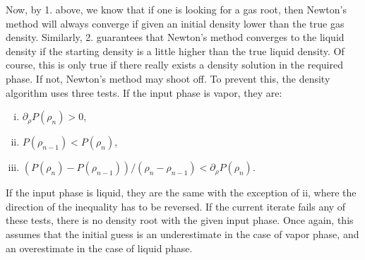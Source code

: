 \documentclass[internal,english]{sintefmemo2012}
\newcommand{\lp}{\left(}
\newcommand{\rp}{\right)}
\numberwithin{equation}{section}
\begin{document}
Now, by 1. above, we know that if one is looking for a gas root, then
Newton's method will always converge if given an initial density lower
than the true gas density. Similarly, 2. guarantees that Newton's
method converges to the liquid density if the starting density is a
little higher than the true liquid density. 
Of course, this is only true if there really exists a density solution
in the required phase. If not, Newton's method may shoot off. To
prevent this, the density algorithm uses three tests. If the input
phase is vapor, they are:
\begin{enumerate}[i)]
\item $\partial_\rho P(\rho_n) > 0$,
\item $P(\rho_{n-1}) < P(\rho_{n})$,
\item $\lp P(\rho_{n})-P(\rho_{n-1}) \rp / (\rho_{n}-\rho_{n-1})
  < \partial_\rho P(\rho_{n})$.
\end{enumerate}
If the input phase is liquid, they are the same with the exception of
ii, where the direction of the inequality has to be reversed. If the
current iterate fails any of these tests, there is no density root
with the given input phase. Once again, this assumes that the initial
guess is an underestimate in the case of vapor phase, and an overestimate in
the case of liquid phase.
\end{document}
